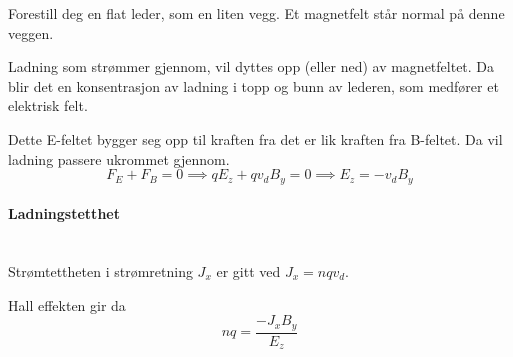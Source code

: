 Forestill deg en flat leder, som en liten vegg.
Et magnetfelt står normal på denne veggen.

Ladning som strømmer gjennom, vil dyttes opp (eller ned) av magnetfeltet.
Da blir det en konsentrasjon av ladning i topp og bunn av lederen,
som medfører et elektrisk felt.

Dette E-feltet bygger seg opp til kraften fra det er lik kraften fra B-feltet.
Da vil ladning passere ukrommet gjennom.
$$F_E + F_B = 0
  \implies qE_z + qv_dB_y = 0
  \implies E_z = -v_dB_y$$



\paragraph{Ladningstetthet} \hfill \\
Strømtettheten i strømretning $J_x$ er gitt ved $J_x = nqv_d$.

Hall effekten gir da
$$nq = \frac{-J_xB_y}{E_z}$$
